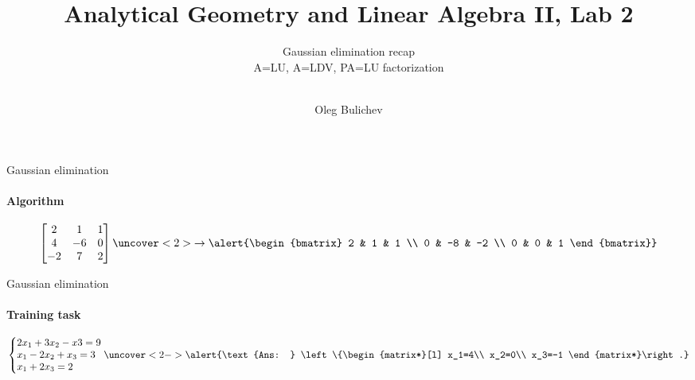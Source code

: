 \documentclass[aspectratio=169,notes]{beamer}
\title[AGLA2]{Analytical Geometry and Linear Algebra II, Lab 2} %
\subtitle{Gaussian elimination recap\\
          A=LU, A=LDV, PA=LU factorization \\ \ } %
\author{Oleg Bulichev}
\newcommand{\fbckg}[1]{\usebackgroundtemplate{\texttt{[image: \#1]}}}%
\begin{document}
\fbckg{fibeamer/figs/title_page.png}

\fbckg{fibeamer/figs/common.png}




\begin{frame}[t]{Gaussian elimination}
    \framesubtitle{Algorithm}
    \Large
    \begin{equation*}
        \begin{bmatrix}
            2  & 1  & 1 \\
            4  & -6 & 0 \\
            -2 & 7  & 2
        \end{bmatrix}
        \uncover<2>{\rightarrow \alert{\begin{bmatrix}
                    2 & 1  & 1  \\
                    0 & -8 & -2 \\
                    0 & 0  & 1
                \end{bmatrix}}}
    \end{equation*}
\end{frame}

\begin{frame}[t]{Gaussian elimination}
    \framesubtitle{Training task}
    \begin{equation*}
        \left\{\begin{matrix*}[l]
            2x_1+3x_2-x3=9\\
            x_1-2x_2+x_3=3\\
            x_1+2x_3=2
        \end{matrix*}\right.
        \uncover<2->{\alert{\text{Ans: } \left\{\begin{matrix*}[l]
                    x_1=4\\
                    x_2=0\\
                    x_3=-1
                \end{matrix*}\right.}}
    \end{equation*}
\end{frame}
\end{document}
